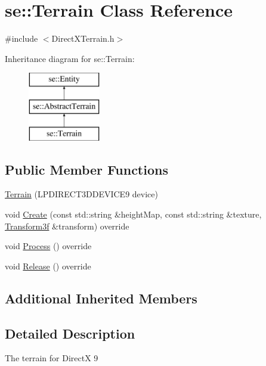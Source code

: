 \hypertarget{classse_1_1_terrain}{}\section{se\+:\+:Terrain Class Reference}
\label{classse_1_1_terrain}


{\ttfamily \#include $<$Direct\+X\+Terrain.\+h$>$}

Inheritance diagram for se\+:\+:Terrain\+:\begin{figure}[H]
\begin{center}
\leavevmode
\includegraphics[height=3.000000cm]{classse_1_1_terrain}
\end{center}
\end{figure}
\subsection*{Public Member Functions}
\begin{DoxyCompactItemize}
\item 
\mbox{\hyperlink{classse_1_1_terrain_aba0253655814ae0fab2b1145e2a4e3d2}{Terrain}} (L\+P\+D\+I\+R\+E\+C\+T3\+D\+D\+E\+V\+I\+C\+E9 device)
\item 
void \mbox{\hyperlink{classse_1_1_terrain_a67309f26fbbf361cc38d2e7e62264648}{Create}} (const std\+::string \&height\+Map, const std\+::string \&texture, \mbox{\hyperlink{classse_1_1_transform3f}{Transform3f}} \&transform) override
\item 
void \mbox{\hyperlink{classse_1_1_terrain_aa4eeb1886f46d2f33e1633b6f7c7345c}{Process}} () override
\item 
void \mbox{\hyperlink{classse_1_1_terrain_a61004e3426795d93190fe8d1f4159759}{Release}} () override
\end{DoxyCompactItemize}
\subsection*{Additional Inherited Members}


\subsection{Detailed Description}
The terrain for DirectX 9 

